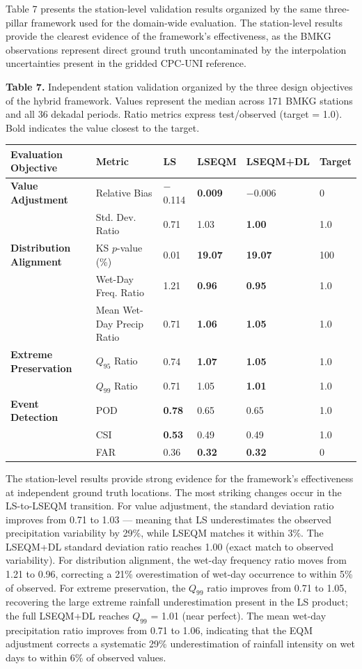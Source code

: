 \documentclass[11pt,a4paper]{article}
\begin{document}
Table 7 presents the station-level validation results organized by the
same three-pillar framework used for the domain-wide evaluation. The
station-level results provide the clearest evidence of the framework's
effectiveness, as the BMKG observations represent direct ground truth
uncontaminated by the interpolation uncertainties present in the gridded
CPC-UNI reference.

\textbf{Table 7.} Independent station validation organized by the three
design objectives of the hybrid framework. Values represent the median
across 171 BMKG stations and all 36 dekadal periods. Ratio metrics
express test/observed (target = 1.0). Bold indicates the value closest
to the target.

\begingroup\small
\begin{longtable}[]{@{}llllll@{}}
\toprule
Evaluation Objective & Metric & LS & LSEQM & LSEQM+DL & Target \\
\midrule
\endhead
\bottomrule
\endlastfoot
\textbf{Value Adjustment} & Relative Bias & $-$0.114 & \textbf{0.009}
& $-$0.006 & 0 \\
& Std. Dev. Ratio & 0.71 & 1.03 & \textbf{1.00} & 1.0 \\
\textbf{Distribution Alignment} & KS \(p\)-value (\%) & 0.01 &
\textbf{19.07} & \textbf{19.07} & 100 \\
& Wet-Day Freq. Ratio & 1.21 & \textbf{0.96} & \textbf{0.95} & 1.0 \\
& Mean Wet-Day Precip Ratio & 0.71 & \textbf{1.06} & \textbf{1.05} &
1.0 \\
\textbf{Extreme Preservation} & \(Q_{95}\) Ratio & 0.74 & \textbf{1.07}
& \textbf{1.05} & 1.0 \\
& \(Q_{99}\) Ratio & 0.71 & 1.05 & \textbf{1.01} & 1.0 \\
\textbf{Event Detection} & POD & \textbf{0.78} & 0.65 & 0.65 & 1.0 \\
& CSI & \textbf{0.53} & 0.49 & 0.49 & 1.0 \\
& FAR & 0.36 & \textbf{0.32} & \textbf{0.32} & 0 \\
\end{longtable}
\endgroup

The station-level results provide strong evidence for the framework's
effectiveness at independent ground truth locations. The most striking
changes occur in the LS-to-LSEQM transition. For value adjustment, the
standard deviation ratio improves from 0.71 to 1.03 --- meaning that LS
underestimates the observed precipitation variability by 29\%, while
LSEQM matches it within 3\%. The LSEQM+DL standard deviation ratio
reaches 1.00 (exact match to observed variability). For distribution
alignment, the wet-day frequency ratio moves from 1.21 to 0.96,
correcting a 21\% overestimation of wet-day occurrence to within 5\% of
observed. For extreme preservation, the \(Q_{99}\) ratio improves from
0.71 to 1.05, recovering the large extreme rainfall underestimation
present in the LS product; the full LSEQM+DL reaches \(Q_{99}\) = 1.01
(near perfect). The mean wet-day precipitation ratio improves from 0.71
to 1.06, indicating that the EQM adjustment corrects a systematic 29\%
underestimation of rainfall intensity on wet days to within 6\% of
observed values.
\end{document}
